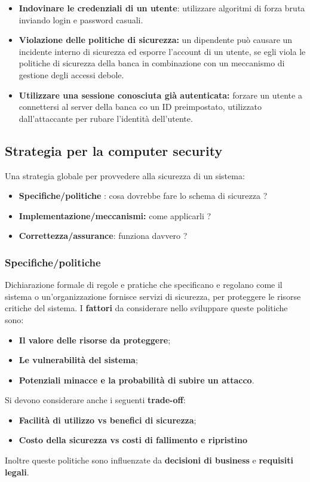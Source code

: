 \documentclass[12pt]{article}
\begin{document}
\begin{itemize}
\begin{itemize}
					\item \textbf{Indovinare le credenziali di un utente}: utilizzare algoritmi di forza bruta inviando login e password casuali.
					\item \textbf{Violazione delle politiche di sicurezza:} un dipendente può causare un incidente interno di sicurezza ed esporre l'account di un utente, se egli viola le politiche di sicurezza della banca in combinazione con un meccanismo di gestione degli accessi debole.
					\item \textbf{Utilizzare una sessione conosciuta già autenticata:} forzare un utente a connettersi al server della banca co un ID preimpostato, utilizzato dall'attaccante per rubare l'identità dell'utente.
				\end{itemize}
				\end{itemize}
			
		\subsection{Strategia per la computer security}
				Una strategia globale per provvedere alla sicurezza di un sistema:
			\begin{itemize}
				\item \textbf{Specifiche/politiche }: cosa dovrebbe fare lo schema di sicurezza ?
				\item \textbf{Implementazione/meccanismi:} come applicarli ?
				\item \textbf{Correttezza/assurance}: funziona davvero ?
			\end{itemize}
			\subsubsection{Specifiche/politiche}
				Dichiarazione formale di regole e pratiche che specificano e regolano come il sistema o un'organizzazione fornisce servizi di sicurezza, per proteggere le risorse critiche del sistema. I \textbf{fattori} da considerare nello sviluppare queste politiche sono:
				\begin{itemize}
					\item \textbf{Il valore delle risorse da proteggere};
					\item \textbf{Le vulnerabilità del sistema};
					\item \textbf{Potenziali minacce e la probabilità di subire un attacco}.
				\end{itemize}
				Si devono considerare anche i seguenti \textbf{trade-off}:
				\begin{itemize}
					\item \textbf{Facilità di utilizzo vs benefici di sicurezza};
					\item \textbf{Costo della sicurezza vs costi di fallimento e ripristino}
				\end{itemize}
				Inoltre queste politiche sono influenzate da \textbf{decisioni di business} e \textbf{requisiti legali}.
\end{document}
